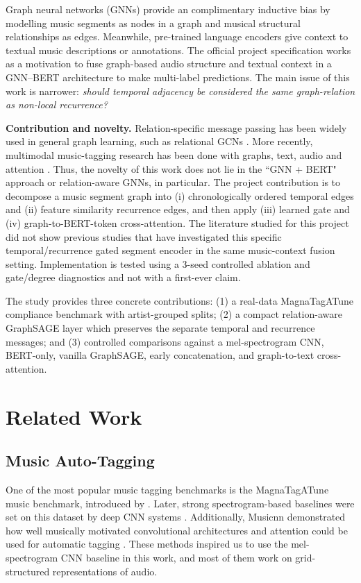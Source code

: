\documentclass[conference]{IEEEtran}
\begin{document}
Graph neural networks (GNNs) provide an complimentary inductive bias by modelling music segments as nodes in a graph and musical structural relationships as edges. Meanwhile, pre-trained language encoders give context to textual music descriptions or annotations. The official project specification works as a motivation to fuse graph-based audio structure and textual context in a GNN--BERT architecture to make multi-label predictions. The main issue of this work is narrower: \emph{should temporal adjacency be considered the same graph-relation as non-local recurrence?}

\textbf{Contribution and novelty.} Relation-specific message passing has been widely used in general graph learning, such as relational GCNs \cite{schlichtkrull2018}. More recently, multimodal music-tagging research has been done with graphs, text, audio and attention \cite{huang2026}. Thus, the novelty of this work does not lie in the ``GNN + BERT" approach or relation-aware GNNs, in particular. The project contribution is to decompose a music segment graph into (i) chronologically ordered temporal edges and (ii) feature similarity recurrence edges, and then apply (iii) learned gate and (iv) graph-to-BERT-token cross-attention. The literature studied for this project did not show previous studies that have investigated this specific temporal/recurrence gated segment encoder in the same music-context fusion setting. Implementation is tested using a 3-seed controlled ablation and gate/degree diagnostics and not with a first-ever claim.

The study provides three concrete contributions: (1) a real-data MagnaTagATune compliance benchmark with artist-grouped splits; (2) a compact relation-aware GraphSAGE layer which preserves the separate temporal and recurrence messages; and (3) controlled comparisons against a mel-spectrogram CNN, BERT-only, vanilla GraphSAGE, early concatenation, and graph-to-text cross-attention.

\section{Related Work}
\subsection{Music Auto-Tagging}
One of the most popular music tagging benchmarks is the MagnaTagATune music benchmark, introduced by \cite{law2009}. Later, strong spectrogram-based baselines were set on this dataset by deep CNN systems \cite{choi2016}. Additionally, Musicnn demonstrated how well musically motivated convolutional architectures and attention could be used for automatic tagging \cite{pons2019}. These methods inspired us to use the mel-spectrogram CNN baseline in this work, and most of them work on grid-structured representations of audio.
\end{document}

